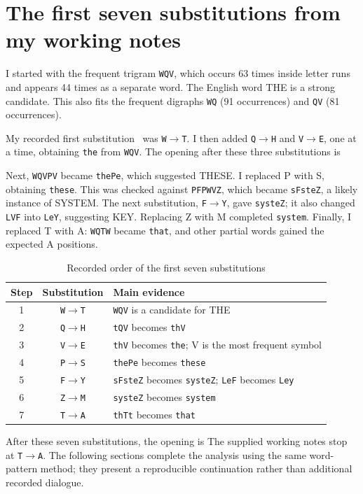 \documentclass{tum_report}
\newcommand{\partialtext}[1]{{\setstretch{1}}}
\newcommand{\pair}[2]{\texttt{#1}$\to$\texttt{#2}}
\begin{document}
\section{The first seven substitutions from my working notes}
I started with the frequent trigram \texttt{WQV}, which occurs 63 times
inside letter runs and appears 44 times as a separate word. The English
word THE is a strong candidate. This also fits the frequent digraphs
\texttt{WQ} (91 occurrences) and \texttt{QV} (81 occurrences).

My recorded first substitution~\cite{ref:notes} was \pair{W}{T}. I then added
\pair{Q}{H} and \pair{V}{E}, one at a time, obtaining \texttt{the} from
\texttt{WQV}. The opening after these three substitutions is
\partialtext{03}

Next, \texttt{WQVPV} became \texttt{thePe}, which suggested THESE.
I replaced P with S, obtaining \texttt{these}. This was checked against
\texttt{PFPWVZ}, which became \texttt{sFsteZ}, a likely instance of SYSTEM.
The next substitution, \pair{F}{Y}, gave \texttt{systeZ}; it also changed
\texttt{LVF} into \texttt{LeY}, suggesting KEY. Replacing Z with M completed
\texttt{system}. Finally, I replaced T with A: \texttt{WQTW} became
\texttt{that}, and other partial words gained the expected A positions.

\begin{table}[H]\caption{Recorded order of the first seven substitutions}
\centering\small
\begin{tabular}{ccl}\toprule
Step & Substitution & Main evidence\\\midrule
1 & \pair{W}{T} & \texttt{WQV} is a candidate for THE\\
2 & \pair{Q}{H} & \texttt{tQV} becomes \texttt{thV}\\
3 & \pair{V}{E} & \texttt{thV} becomes \texttt{the}; V is the most frequent symbol\\
4 & \pair{P}{S} & \texttt{thePe} becomes \texttt{these}\\
5 & \pair{F}{Y} & \texttt{sFsteZ} becomes \texttt{systeZ}; \texttt{LeF} becomes \texttt{Ley}\\
6 & \pair{Z}{M} & \texttt{systeZ} becomes \texttt{system}\\
7 & \pair{T}{A} & \texttt{thTt} becomes \texttt{that}\\\bottomrule
\end{tabular}\end{table}

After these seven substitutions, the opening is
\partialtext{07}
The supplied working notes stop at \pair{T}{A}. The following sections
complete the analysis using the same word-pattern method; they present a
reproducible continuation rather than additional recorded dialogue.
\end{document}

